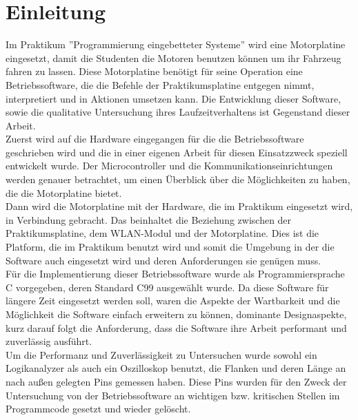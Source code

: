 \chapter{Einleitung}

Im Praktikum ''Programmierung eingebetteter Systeme'' wird eine Motorplatine \cite{STUD_TIMO}
eingesetzt, damit die Studenten die Motoren benutzen können um ihr Fahrzeug
fahren zu lassen. Diese Motorplatine benötigt für seine Operation eine
Betriebssoftware, die die Befehle der Praktikumsplatine entgegen nimmt,
interpretiert und in Aktionen umsetzen kann. Die Entwicklung dieser Software,
sowie die qualitative Untersuchung ihres Laufzeitverhaltens ist Gegenstand
dieser Arbeit.\\
Zuerst wird auf die Hardware eingegangen für die die Betriebssoftware geschrieben wird
und die in einer eigenen Arbeit für diesen Einsatzzweck speziell entwickelt wurde.
Der Microcontroller und die Kommunikationseinrichtungen werden genauer betrachtet, um
einen Überblick über die Möglichkeiten zu haben, die die Motorplatine bietet.\\
Dann wird die Motorplatine mit der Hardware, die im Praktikum eingesetzt wird, in Verbindung
gebracht. Das beinhaltet die Beziehung zwischen der Praktikumsplatine, dem WLAN-Modul und der
Motorplatine. Dies ist die Platform, die im Praktikum benutzt wird und somit die Umgebung in
der die Software auch eingesetzt wird und deren Anforderungen sie genügen muss.\\
Für die Implementierung dieser Betriebssoftware wurde als Programmiersprache
C \cite{C_PROG} vorgegeben, deren Standard C99 ausgewählt wurde. Da diese
Software für längere Zeit eingesetzt werden soll, waren die Aspekte der
Wartbarkeit und die Möglichkeit die Software einfach erweitern zu können,
dominante Designaspekte, kurz darauf folgt die Anforderung, dass die Software
ihre Arbeit performant und zuverlässig ausführt.\\
Um die Performanz und Zuverlässigkeit zu Untersuchen wurde sowohl ein
Logikanalyzer als auch ein Oszilloskop benutzt, die Flanken und deren Länge
an nach außen gelegten Pins gemessen haben. Diese Pins wurden für den Zweck
der Untersuchung von der Betriebssoftware an wichtigen bzw. kritischen Stellen
im Programmcode gesetzt und wieder gelöscht.
